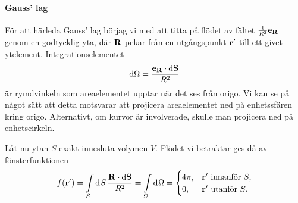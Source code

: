 \paragraph{Gauss' lag}
För att härleda Gauss' lag börjag vi med att titta på flödet av fältet $\frac{1}{R^{2}}\vb{e}_{\vb{R}}$ genom en godtycklig yta, där $\vb{R}$ pekar från en utgångspunkt $\vb{r}'$ till ett givet ytelement. Integrationselementet
\begin{align*}
	\dd{\Omega} = \frac{\vb{e}_{\vb{R}}\cdot\vb{\dd{S}}}{R^{2}}
\end{align*}
är rymdvinkeln som areaelementet upptar när det ses från origo. Vi kan se på något sätt att detta motsvarar att projicera areaelementet ned på enhetssfären kring origo. Alternativt, om kurvor är involverade, skulle man projicera ned på enhetscirkeln.

Låt nu ytan $S$ exakt innesluta volymen $V$. Flödet vi betraktar ges då av fönsterfunktionen
\begin{align*}
	f(\vb{r}') = \int\limits_{S}^{}\dd[]{S}\frac{\vb{R}\cdot\vb{\dd{S}}}{R^{2}} = \int\limits_{\Omega}^{}\dd[]{\Omega} =
	\begin{cases}
		4\pi, &\vb{r}'\text{ innanför }S, \\
		0,    &\vb{r}'\text{ utanför }S.
	\end{cases}
\end{align*}